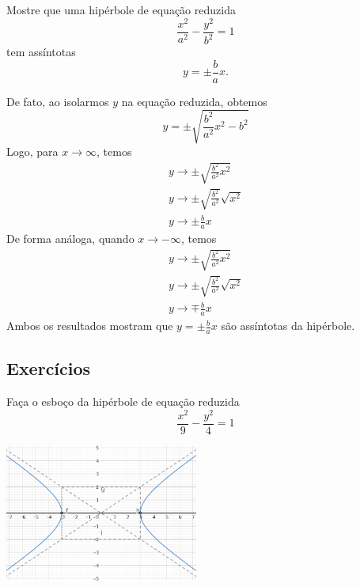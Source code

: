 \begin{exeresol}
  Mostre que uma hipérbole de equação reduzida
  \begin{equation}
    \frac{x^2}{a^2} - \frac{y^2}{b^2} = 1
  \end{equation}
  tem assíntotas
  \begin{equation}
    y = \pm \frac{b}{a}x.
  \end{equation}
\end{exeresol}
\begin{resol}
  De fato, ao isolarmos $y$ na equação reduzida, obtemos
  \begin{equation}
    y = \pm\sqrt{\frac{b^2}{a^2}x^2 - b^2}
  \end{equation}
  Logo, para $x\to \infty$, temos
  \begin{gather}
    y\to \pm\sqrt{\frac{b^2}{a^2}x^2} \\
    y\to \pm\sqrt{\frac{b^2}{a^2}}\sqrt{x^2}\\
    y\to \pm\frac{b}{a}x
  \end{gather}
  De forma análoga, quando $x\to -\infty$, temos
  \begin{gather}
    y\to \pm\sqrt{\frac{b^2}{a^2}x^2} \\
    y\to \pm\sqrt{\frac{b^2}{a^2}}\sqrt{x^2}\\
    y\to \mp\frac{b}{a}x
  \end{gather}
  Ambos os resultados mostram que $\displaystyle y=\pm\frac{b}{a}x$ são assíntotas da hipérbole.
\end{resol}

\subsection*{Exercícios}

\begin{exer}
  Faça o esboço da hipérbole de equação reduzida
  \begin{equation}
    \frac{x^2}{9} - \frac{y^2}{4} = 1
  \end{equation}
\end{exer}
\begin{resp}

  \includegraphics[width=2.5in]{cap_conicas/dados/fig_hiperbole_exer_ox/fig.png}
\end{resp}

